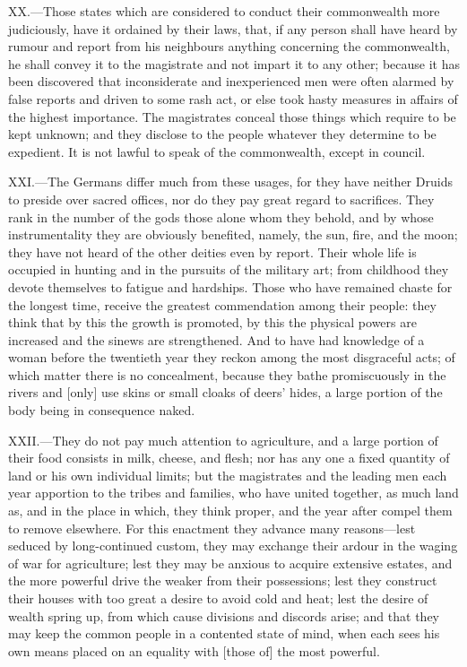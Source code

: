 XX.—Those states which are considered to conduct their commonwealth
more judiciously, have it ordained by their laws, that, if any person
shall have heard by rumour and report from his neighbours anything
concerning the commonwealth, he shall convey it to the magistrate and
not impart it to any other; because it has been discovered that
inconsiderate and inexperienced men were often alarmed by false reports
and driven to some rash act, or else took hasty measures in affairs of
the highest importance. The magistrates conceal those things which
require to be kept unknown; and they disclose to the people whatever
they determine to be expedient. It is not lawful to speak of the
commonwealth, except in council.

XXI.—The Germans differ much from these usages, for they have neither
Druids to preside over sacred offices, nor do they pay great regard to
sacrifices. They rank in the number of the gods those alone whom they
behold, and by whose instrumentality they are obviously benefited,
namely, the sun, fire, and the moon; they have not heard of the other
deities even by report. Their whole life is occupied in hunting and in
the pursuits of the military art; from childhood they devote themselves
to fatigue and hardships. Those who have remained chaste for the longest
time, receive the greatest commendation among their people: they think
that by this the growth is promoted, by this the physical powers are
increased and the sinews are strengthened. And to have had knowledge of
a woman before the twentieth year they reckon among the most disgraceful
acts; of which matter there is no concealment, because they bathe
promiscuously in the rivers and [only] use skins or small cloaks of
deers' hides, a large portion of the body being in consequence naked.

XXII.—They do not pay much attention to agriculture, and a large
portion of their food consists in milk, cheese, and flesh; nor has any
one a fixed quantity of land or his own individual limits; but the
magistrates and the leading men each year apportion to the tribes and
families, who have united together, as much land as, and in the place in
which, they think proper, and the year after compel them to remove
elsewhere. For this enactment they advance many reasons—lest seduced by
long-continued custom, they may exchange their ardour in the waging of
war for agriculture; lest they may be anxious to acquire extensive
estates, and the more powerful drive the weaker from their possessions;
lest they construct their houses with too great a desire to avoid cold
and heat; lest the desire of wealth spring up, from which cause
divisions and discords arise; and that they may keep the common people
in a contented state of mind, when each sees his own means placed on an
equality with [those of] the most powerful.

